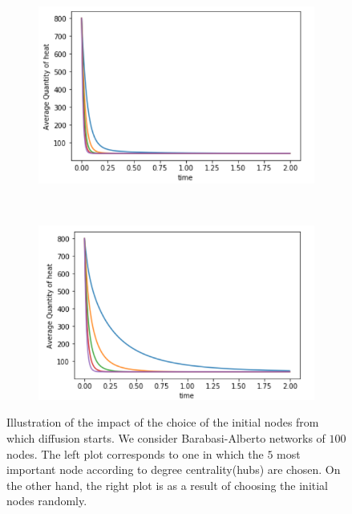\documentclass[10pt,a4paper]{article}
\begin{document}
\begin{figure}[!h]
	\centering
	\begin{subfigure}[b]{0.40\textwidth}
		\includegraphics[width=\textwidth]{images/Barabasi-highest-degree.png}
	\end{subfigure}~
	\begin{subfigure}[b]{0.40\textwidth}
		\includegraphics[width= \textwidth]{images/barabasi-random-selection.png}
	\end{subfigure}
	\caption{Illustration of the impact of the choice of the initial nodes from which diffusion starts. We consider Barabasi-Alberto networks of $100$ nodes. The left plot corresponds to one in which the $5$ most important node according to degree centrality(hubs) are chosen. On the other hand, the right plot is as a result of choosing the initial nodes randomly. }
	\label{}
\end{figure}
\end{document}
